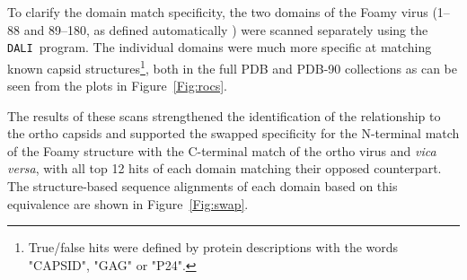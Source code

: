 \documentclass[12pt]{article}
\newcommand{\Fig}[1]{Figure~\ref{Fig:#1}}
\newcommand{\3}{$3_{10}$}
\newcommand{\DALI}{{\tt DALI}}
\begin{document}
To clarify the domain match specificity, the two domains of the Foamy virus (1--88 and 89--180,
as defined automatically \cite{TaylorWR99b}) were scanned separately using the \DALI\ program.  
The individual domains were much more specific at matching known capsid structures\footnote{
True/false hits were defined by protein descriptions with the words "CAPSID", "GAG" or "P24".
},   
both in the full PDB and PDB-90 collections as can be seen from the plots in \Fig{rocs}.

The results of these scans strengthened the identification
of the relationship to the ortho capsids and supported the swapped specificity for the N-terminal
match of the Foamy structure with the C-terminal match of the ortho virus and {\em vica versa}, with all
top 12 hits of each domain matching their opposed counterpart.
The structure-based sequence alignments of each domain based on this equivalence are shown in \Fig{swap}.
\end{document}
